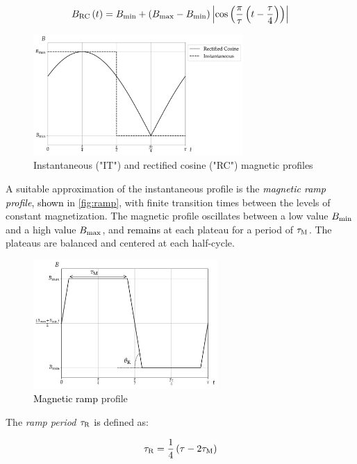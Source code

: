 \documentclass[referee]{svjour3}
\begin{document}
\begin{equation}
{B}_{\mathrm{RC}}\,(t) = B_{\mathrm{min}} + \left(B_{\mathrm{max}} - B_{\mathrm{min}}\right)  \left\lvert \cos\left( \frac{\pi}{\tau} \left( t - \frac{\tau}{4}\right)\right) \right\rvert
\label{eq:200}
\end{equation}

\begin{figure}[!ht]
  \centering
  \includegraphics[width=8cm]{profiles_it_and_rc}
  \caption{Instantaneous ("IT") and rectified cosine ("RC") magnetic profiles}
  \label{fig:itrc}
\end{figure}

A suitable approximation of the instantaneous profile is the \textcolor{black}{\emph{magnetic ramp profile}, shown} in \autoref{fig:ramp}, with finite transition times between the levels of constant magnetization. The magnetic profile oscillates  between a low value \({B}_{\mathrm{min}}\) and a high value \({B}_{\mathrm{max}}\), and \textcolor{black}{remains} at each plateau for a period of \(\tau_{\mathrm{M}}\). The plateaus are balanced and centered at each half-cycle.

\begin{figure}[!ht]
  \centering
  \includegraphics[width=7cm]{profile_rm}
  \caption{\textcolor{black}{Magnetic ramp}  profile}
  \label{fig:ramp}
\end{figure}

The \emph{ramp period} \(\tau_{\mathrm{R}}\) \textcolor{black}{is} defined as:

\begin{equation}
\label{eq:201}
\tau_{\mathrm{R}} = \frac{1}{4}\left(\tau - 2 \tau_{\mathrm{M}}\right)
\end{equation}
\end{document}
